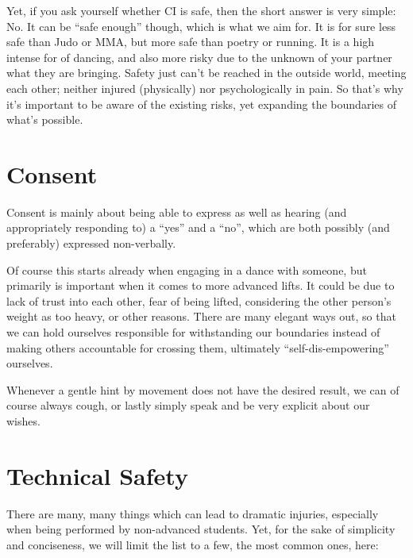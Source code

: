 Yet, if you ask yourself whether CI is safe, then the short answer is very simple: No.
It can be ``safe enough'' though, which is what we aim for.
It is for sure less safe than Judo or MMA, but more safe than poetry or running.
It is a high intense for of dancing, and also more risky due to the unknown of your partner what they are bringing.
Safety just can't be reached in the outside world, meeting each other;
neither injured (physically) nor psychologically in pain.
So that's why it's important to be aware of the existing risks, yet expanding the boundaries of what's possible.

\section{Consent}\label{sec:consent}

Consent is mainly about being able to express as well as hearing (and appropriately responding to) a ``yes'' and a ``no'', which are both possibly (and preferably) expressed non-verbally.

Of course this starts already when engaging in a dance with someone, but primarily is important when it comes to more advanced lifts.
It could be due to lack of trust into each other, fear of being lifted, considering the other person's weight as too heavy, or other reasons.
There are many elegant ways out, so that we can hold ourselves responsible for withstanding our boundaries instead of making others accountable for crossing them, ultimately ``self-dis-empowering'' ourselves.

Whenever a gentle hint by movement does not have the desired result, we can of course always cough, or lastly simply speak and be very explicit about our wishes.

\section{Technical Safety}\label{sec:technical-safety}

There are many, many things which can lead to dramatic injuries, especially when being performed by non-advanced students.
Yet, for the sake of simplicity and conciseness, we will limit the list to a few, the most common ones, here:


